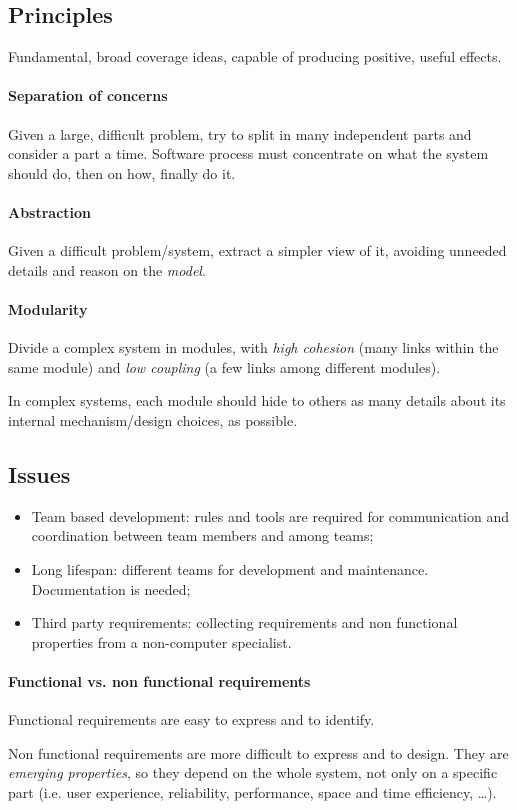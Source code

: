 \subsection{Principles}
Fundamental, broad coverage ideas, capable of producing positive, useful effects.

\paragraph{Separation of concerns}
Given a large, difficult problem, try to split in many independent parts and consider a part a time. Software process must concentrate on what the system should do, then on how, finally do it.

\paragraph{Abstraction}
Given a difficult problem/system, extract a simpler view of it, avoiding unneeded details and reason on the \emph{model}.

\paragraph{Modularity}
Divide a complex system in modules, with \emph{high cohesion} (many links within the same module) and \emph{low coupling} (a few links among different modules).

In complex systems, each module should hide to others as many details about its internal mechanism/design choices, as possible.

\subsection{Issues}
\begin{itemize}
\item Team based development: rules and tools are required for communication and coordination between team members and among teams;
\item Long lifespan: different teams for development and maintenance. Documentation is needed;
\item Third party requirements: collecting requirements and non functional properties from a non-computer specialist.
\end{itemize}

\paragraph{Functional vs. non functional requirements}
Functional requirements are easy to express and to identify.

Non functional requirements are more difficult to express and to design. They are \emph{emerging properties}, so they depend on the whole system, not only on a specific part (i.e\@. user experience, reliability, performance, space and time efficiency, \dots).